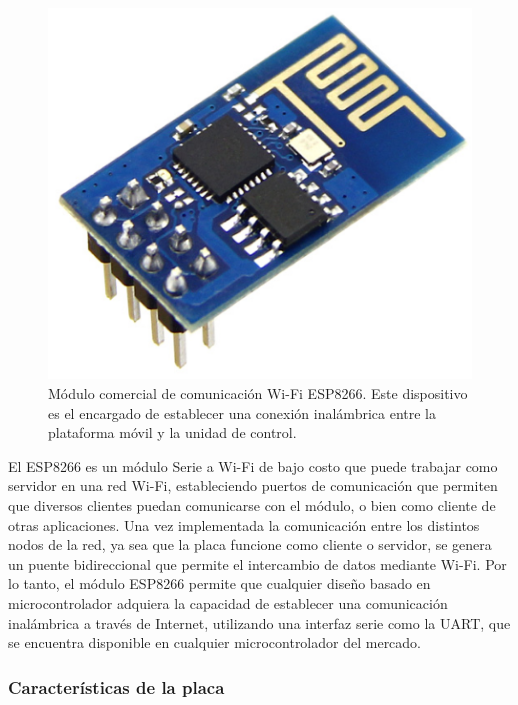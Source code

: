 \documentclass[conference,a4paper,9pt]{IEEEtran}
\begin{document}
\begin{figure}%
\centering\includegraphics[scale=1]{esp.eps}%
\caption{Módulo comercial de comunicación Wi-Fi ESP8266. Este dispositivo es el encargado de establecer una conexión inalámbrica entre la plataforma móvil y la unidad de control.}%
\label{esp}%
\end{figure}

El ESP8266 es un módulo Serie a Wi-Fi de bajo costo que puede trabajar como servidor en una red Wi-Fi, estableciendo puertos de comunicación que permiten que diversos clientes puedan comunicarse con el módulo, o bien como cliente de otras aplicaciones. Una vez implementada la comunicación entre los distintos nodos de la red, ya sea que la placa funcione como cliente o servidor, se genera un puente bidireccional que permite el intercambio de datos mediante Wi-Fi. Por lo tanto, el módulo ESP8266 permite que cualquier diseño basado en microcontrolador adquiera la capacidad de establecer una comunicación inalámbrica a través de Internet, utilizando una interfaz serie como la UART, que se encuentra disponible en cualquier microcontrolador del mercado.

\subsubsection{Características de la placa}
\end{document}
